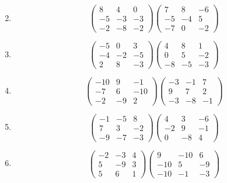 \documentclass{article}%
\begin{document}
\begin{enumerate}[label=\arabic*),start=16]
\[\]%
\item%
\[%
\begin{pmatrix}%
8&4&0\\%
-5&-3&-3\\%
-2&-8&-2%
\end{pmatrix} \begin{pmatrix}%
7&8&-6\\%
-5&-4&5\\%
-7&0&-2%
\end{pmatrix}%
\]%
\item%
\[%
\begin{pmatrix}%
-5&0&3\\%
-4&-2&-5\\%
2&8&-3%
\end{pmatrix} \begin{pmatrix}%
4&8&1\\%
0&5&-2\\%
-8&-5&-3%
\end{pmatrix}%
\]%
\item%
\[%
\begin{pmatrix}%
-10&9&-1\\%
-7&6&-10\\%
-2&-9&2%
\end{pmatrix} \begin{pmatrix}%
-3&-1&7\\%
9&7&2\\%
-3&-8&-1%
\end{pmatrix}%
\]%
\item%
\[%
\begin{pmatrix}%
-1&-5&8\\%
7&3&-2\\%
-9&-7&-3%
\end{pmatrix} \begin{pmatrix}%
4&3&-6\\%
-2&9&-1\\%
0&-8&4%
\end{pmatrix}%
\]%
\item%
\[%
\begin{pmatrix}%
-2&-3&4\\%
5&-9&3\\%
5&6&1%
\end{pmatrix} \begin{pmatrix}%
9&-10&6\\%
-10&5&-9\\%
-10&-1&-3%
\end{pmatrix}%
\]%
\end{enumerate}

%
\end{document}

